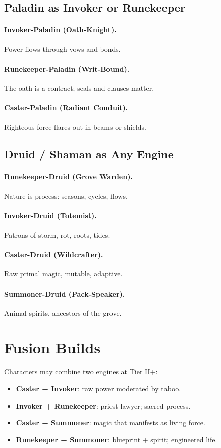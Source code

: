 \documentclass[11pt]{book}
\begin{document}
\subsection{Paladin as Invoker or Runekeeper}
\paragraph{Invoker-Paladin (Oath-Knight).}
Power flows through vows and bonds.

\paragraph{Runekeeper-Paladin (Writ-Bound).}
The oath is a contract; seals and clauses matter.

\paragraph{Caster-Paladin (Radiant Conduit).}
Righteous force flares out in beams or shields.

\subsection{Druid / Shaman as Any Engine}
\paragraph{Runekeeper-Druid (Grove Warden).}
Nature is process: seasons, cycles, flows.

\paragraph{Invoker-Druid (Totemist).}
Patrons of storm, rot, roots, tides.

\paragraph{Caster-Druid (Wildcrafter).}
Raw primal magic, mutable, adaptive.

\paragraph{Summoner-Druid (Pack-Speaker).}
Animal spirits, ancestors of the grove.

\section{Fusion Builds}
Characters may combine two engines at Tier II+:
\begin{itemize}
  \item \textbf{Caster + Invoker}: raw power moderated by taboo.
  \item \textbf{Invoker + Runekeeper}: priest-lawyer; sacred process.
  \item \textbf{Caster + Summoner}: magic that manifests as living force.
  \item \textbf{Runekeeper + Summoner}: blueprint + spirit; engineered life.
\end{itemize}
\end{document}
